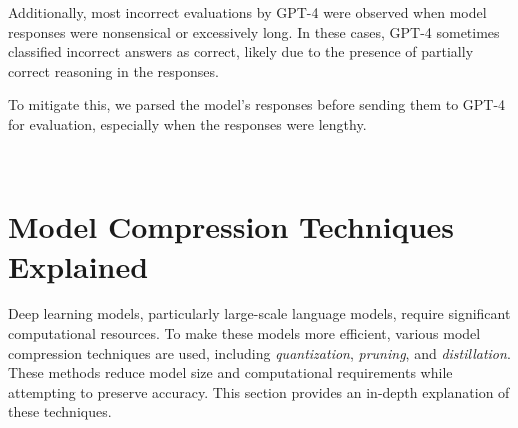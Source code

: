 Additionally, most incorrect evaluations by GPT-4 were observed when model responses were nonsensical or excessively long. In these cases, GPT-4 sometimes classified incorrect answers as correct, likely due to the presence of partially correct reasoning in the responses.\medskip

To mitigate this, we parsed the model's responses before sending them to GPT-4 for evaluation, especially when the responses were lengthy.


\newpage
~\newpage






\section{Model Compression Techniques Explained}

Deep learning models, particularly large-scale language models, require significant computational resources. To make these models more efficient, various model compression techniques are used, including \textit{quantization}, \textit{pruning}, and \textit{distillation}. These methods reduce model size and computational requirements while attempting to preserve accuracy. This section provides an in-depth explanation of these techniques.

